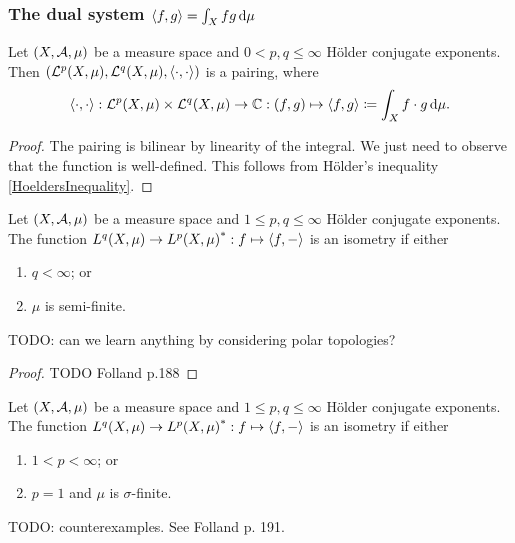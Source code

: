 \subsubsection{The dual system $\left\langle f,g \right\rangle = \int_X fg \operatorname{d \!}\mu$}

\begin{lemma}
Let $\sSet{X, \mathcal{A}, \mu}$ be a measure space and $0<p,q\leq \infty$ Hölder conjugate exponents. Then $\sSet{\mathcal{L}^p(X,\mu), \mathcal{L}^q(X,\mu), \pair{\cdot, \cdot}}$ is a pairing, where
\[ \left\langle \cdot, \cdot \right\rangle: \mathcal{L}^p(X,\mu)\times \mathcal{L}^q(X,\mu) \to \mathbb{C}: (f,g) \mapsto \left\langle f,g \right\rangle \coloneqq \int_X f\cdot g \operatorname{d \!}\mu. \]
\end{lemma}
\begin{proof}
The pairing is bilinear by linearity of the integral. We just need to observe that the function is well-defined. This follows from Hölder's inequality \ref{HoeldersInequality}.
\end{proof}

\begin{proposition}
Let $\sSet{X, \mathcal{A}, \mu}$ be a measure space and $1 \leq p,q\leq \infty$ Hölder conjugate exponents. The function $L^q(X,\mu)\to {L^p(X,\mu)}^*: f \mapsto \left\langle f,- \right\rangle$ is an isometry if either
\begin{enumerate}
\item $q<\infty$; or
\item $\mu$ is semi-finite.
\end{enumerate}
\end{proposition}
TODO: can we learn anything by considering polar topologies?
\begin{proof}
TODO Folland p.188
\end{proof}

\begin{proposition}
Let $\sSet{X, \mathcal{A}, \mu}$ be a measure space and $1\leq p,q \leq \infty$ Hölder conjugate exponents. The function $L^q(X,\mu)\to {L^p(X,\mu)}^*: f \mapsto \left\langle f,- \right\rangle$ is an isometry if either
\begin{enumerate}
\item $1<p<\infty$; or
\item $p=1$ and $\mu$ is $\sigma$-finite.
\end{enumerate}
\end{proposition}

\begin{example}
TODO: counterexamples. See Folland p. 191.
\end{example}

